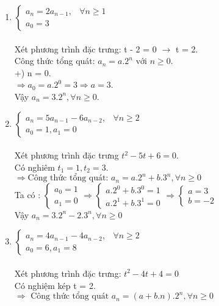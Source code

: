 \documentclass[12pt,oneside]{book}
\begin{document}
\begin{enumerate}[label = \alph*)]
	\item $
	\begin{cases}
		a_n = 2a_{n-1}, &\forall n \geq  1\\
		a_0 = 3
	\end{cases}$\\
	\\Xét phương trình đặc trưng: t - 2  = 0 $\rightarrow$ t = 2.\\
	Công thức tổng  quát: $a_n = a.2^n \text{ với } n \geq 0$.\\
	+) n =  0.\\
	$\Rightarrow a_0 = a.2^0 =3 \Rightarrow a = 3$.\\
	Vậy  $a_n = 3.2^n  ,\forall n \geq 0.$
	\item $\begin{cases}
		a_n = 5a_{n-1}-6a_{n-2}, &   \forall n \geq 2
		\\ a_0 = 1, a_1 = 0
	\end{cases}$\\\\
	Xét phương trình đặc trưng $t^2-5t+6 = 0$.\\
	Có nghiêm $t_1 = 1, t_2 = 3$.\\
	$\Rightarrow \text{Công thức tổng quát: } a_n = a.2^n+b.3^n, \forall n \geq 0$\\
	Ta có : $\begin{cases}
		a_0 =1\\
		a_1 = 0
	\end{cases}
	\Rightarrow \begin{cases}
		a.2^0+b.3^0 = 1\\
		a.2^1+b.3^1 = 0
	\end{cases}
	\Rightarrow \begin{cases}
		a = 3\\
		b = -2
	\end{cases}$
	\\Vậy $a_n = 3.2^n-2.3^n, \forall n \geq 0$
	\item$ 
	\begin{cases}
		a_n = 4a_{n-1}-4a_{n-2},& \forall n \geq 2\\
		a_0 = 6, a_1 = 8
	\end{cases}$\\
	\\ Xét phương trình đặc trưng: $t^2-4t+4 = 0$\\
	Có nghiệm kép t = 2.\\
	$\Rightarrow \text{ Công thức tổng quát } a_n = (a+b.n).2^n, \forall n \geq 0$\\

\end{enumerate}
\end{document}
